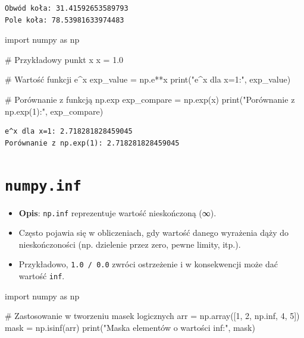 \documentclass[
  polish,
  letterpaper,
  DIV=11,
  numbers=noendperiod]{scrreprt}
\newenvironment{Shaded}{\begin{snugshade}}{\end{snugshade}}
\newcommand{\BuiltInTok}[1]{\textcolor[rgb]{0.00,0.23,0.31}{#1}}
\newcommand{\CommentTok}[1]{\textcolor[rgb]{0.37,0.37,0.37}{#1}}
\newcommand{\DecValTok}[1]{\textcolor[rgb]{0.68,0.00,0.00}{#1}}
\newcommand{\FloatTok}[1]{\textcolor[rgb]{0.68,0.00,0.00}{#1}}
\newcommand{\ImportTok}[1]{\textcolor[rgb]{0.00,0.46,0.62}{#1}}
\newcommand{\NormalTok}[1]{\textcolor[rgb]{0.00,0.23,0.31}{#1}}
\newcommand{\OperatorTok}[1]{\textcolor[rgb]{0.37,0.37,0.37}{#1}}
\newcommand{\StringTok}[1]{\textcolor[rgb]{0.13,0.47,0.30}{#1}}
\providecommand{\tightlist}{%
  \setlength{\itemsep}{0pt}\setlength{\parskip}{0pt}}
\begin{document}
\begin{verbatim}
Obwód koła: 31.41592653589793
Pole koła: 78.53981633974483
\end{verbatim}

\begin{Shaded}
\begin{Highlighting}[]
\ImportTok{import}\NormalTok{ numpy }\ImportTok{as}\NormalTok{ np}

\CommentTok{\# Przykładowy punkt x}
\NormalTok{x }\OperatorTok{=} \FloatTok{1.0}

\CommentTok{\# Wartość funkcji e\^{}x}
\NormalTok{exp\_value }\OperatorTok{=}\NormalTok{ np.e}\OperatorTok{**}\NormalTok{x}
\BuiltInTok{print}\NormalTok{(}\StringTok{"e\^{}x dla x=1:"}\NormalTok{, exp\_value)}

\CommentTok{\# Porównanie z funkcją np.exp}
\NormalTok{exp\_compare }\OperatorTok{=}\NormalTok{ np.exp(x)}
\BuiltInTok{print}\NormalTok{(}\StringTok{"Porównanie z np.exp(1):"}\NormalTok{, exp\_compare)}
\end{Highlighting}
\end{Shaded}

\begin{verbatim}
e^x dla x=1: 2.718281828459045
Porównanie z np.exp(1): 2.718281828459045
\end{verbatim}

\section{\texorpdfstring{\texttt{numpy.inf}}{numpy.inf}}\label{numpy.inf}

\begin{itemize}
\tightlist
\item
  \textbf{Opis}: \texttt{np.inf} reprezentuje wartość nieskończoną
  (∞).\\
\item
  Często pojawia się w obliczeniach, gdy wartość danego wyrażenia dąży
  do nieskończoności (np. dzielenie przez zero, pewne limity, itp.).\\
\item
  Przykładowo, \texttt{1.0\ /\ 0.0} zwróci ostrzeżenie i w konsekwencji
  może dać wartość \texttt{inf}.
\end{itemize}

\begin{Shaded}
\begin{Highlighting}[]
\ImportTok{import}\NormalTok{ numpy }\ImportTok{as}\NormalTok{ np}

\CommentTok{\# Zastosowanie w tworzeniu masek logicznych}
\NormalTok{arr }\OperatorTok{=}\NormalTok{ np.array([}\DecValTok{1}\NormalTok{, }\DecValTok{2}\NormalTok{, np.inf, }\DecValTok{4}\NormalTok{, }\DecValTok{5}\NormalTok{])}
\NormalTok{mask }\OperatorTok{=}\NormalTok{ np.isinf(arr)}
\BuiltInTok{print}\NormalTok{(}\StringTok{"Maska elementów o wartości inf:"}\NormalTok{, mask)}
\end{Highlighting}
\end{Shaded}
\end{document}
